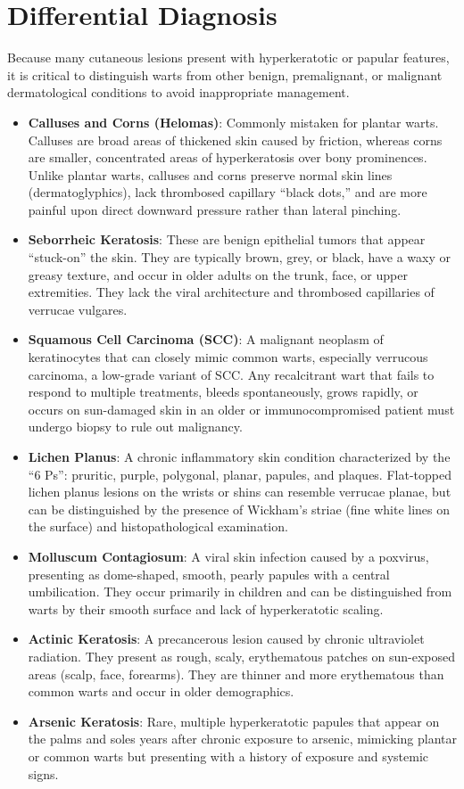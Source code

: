 \section*{Differential Diagnosis}
Because many cutaneous lesions present with hyperkeratotic or papular features, it is critical to distinguish warts from other benign, premalignant, or malignant dermatological conditions to avoid inappropriate management.

\begin{itemize}
    \item \textbf{Calluses and Corns (Helomas)}: Commonly mistaken for plantar warts. Calluses are broad areas of thickened skin caused by friction, whereas corns are smaller, concentrated areas of hyperkeratosis over bony prominences. Unlike plantar warts, calluses and corns preserve normal skin lines (dermatoglyphics), lack thrombosed capillary ``black dots,'' and are more painful upon direct downward pressure rather than lateral pinching.
    \item \textbf{Seborrheic Keratosis}: These are benign epithelial tumors that appear ``stuck-on'' the skin. They are typically brown, grey, or black, have a waxy or greasy texture, and occur in older adults on the trunk, face, or upper extremities. They lack the viral architecture and thrombosed capillaries of verrucae vulgares.
    \item \textbf{Squamous Cell Carcinoma (SCC)}: A malignant neoplasm of keratinocytes that can closely mimic common warts, especially verrucous carcinoma, a low-grade variant of SCC. Any recalcitrant wart that fails to respond to multiple treatments, bleeds spontaneously, grows rapidly, or occurs on sun-damaged skin in an older or immunocompromised patient must undergo biopsy to rule out malignancy.
    \item \textbf{Lichen Planus}: A chronic inflammatory skin condition characterized by the ``6 Ps'': pruritic, purple, polygonal, planar, papules, and plaques. Flat-topped lichen planus lesions on the wrists or shins can resemble verrucae planae, but can be distinguished by the presence of Wickham's striae (fine white lines on the surface) and histopathological examination.
    \item \textbf{Molluscum Contagiosum}: A viral skin infection caused by a poxvirus, presenting as dome-shaped, smooth, pearly papules with a central umbilication. They occur primarily in children and can be distinguished from warts by their smooth surface and lack of hyperkeratotic scaling.
    \item \textbf{Actinic Keratosis}: A precancerous lesion caused by chronic ultraviolet radiation. They present as rough, scaly, erythematous patches on sun-exposed areas (scalp, face, forearms). They are thinner and more erythematous than common warts and occur in older demographics.
    \item \textbf{Arsenic Keratosis}: Rare, multiple hyperkeratotic papules that appear on the palms and soles years after chronic exposure to arsenic, mimicking plantar or common warts but presenting with a history of exposure and systemic signs.
\end{itemize}


